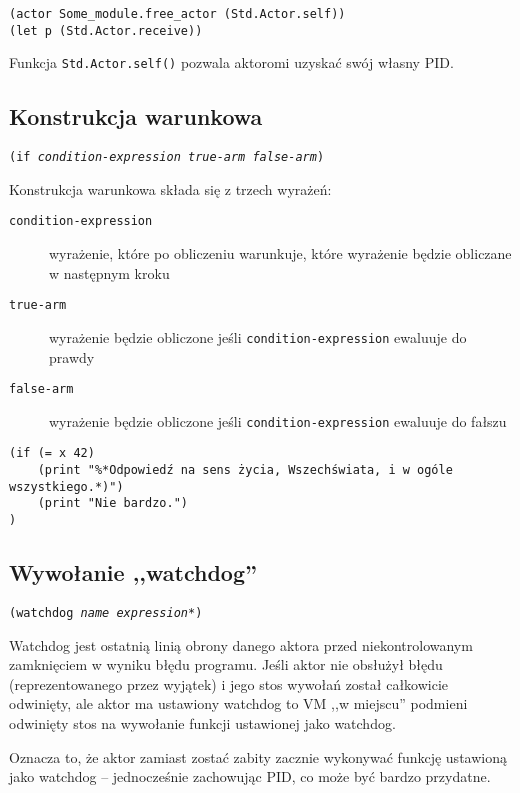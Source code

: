 \begin{lstlisting}
(actor Some_module.free_actor (Std.Actor.self))
(let p (Std.Actor.receive))
\end{lstlisting}

Funkcja \texttt{Std.Actor.self()} pozwala aktoromi uzyskać swój własny PID.

\subsection{Konstrukcja warunkowa}

\texttt{(if \emph{condition-expression} \emph{true-arm} \emph{false-arm})}
\newline

Konstrukcja warunkowa składa się z trzech wyrażeń:

\begin{description}
    \item[\texttt{condition-expression}] wyrażenie, które po obliczeniu warunkuje, które wyrażenie będzie
        obliczane w następnym kroku
    \item[\texttt{true-arm}] wyrażenie będzie obliczone jeśli \texttt{condition-expression} ewaluuje do prawdy
    \item[\texttt{false-arm}] wyrażenie będzie obliczone jeśli \texttt{condition-expression} ewaluuje do
        fałszu
\end{description}

\begin{lstlisting}
(if (= x 42)
    (print "%*Odpowiedź na sens życia, Wszechświata, i w ogóle wszystkiego.*)")
    (print "Nie bardzo.")
)
\end{lstlisting}

\subsection{Wywołanie ,,watchdog''}

\texttt{(watchdog \emph{name} \emph{expression}*)}
\newline

Watchdog jest ostatnią linią obrony danego aktora przed niekontrolowanym zamknięciem w wyniku błędu programu.
Jeśli aktor nie obsłużył błędu (reprezentowanego przez wyjątek) i jego stos wywołań został całkowicie
odwinięty, ale aktor ma ustawiony watchdog to VM ,,w miejscu'' podmieni odwinięty stos na wywołanie funkcji
ustawionej jako watchdog.

Oznacza to, że aktor zamiast zostać zabity zacznie wykonywać funkcję ustawioną jako watchdog -- jednocześnie
zachowując PID, co może być bardzo przydatne.

